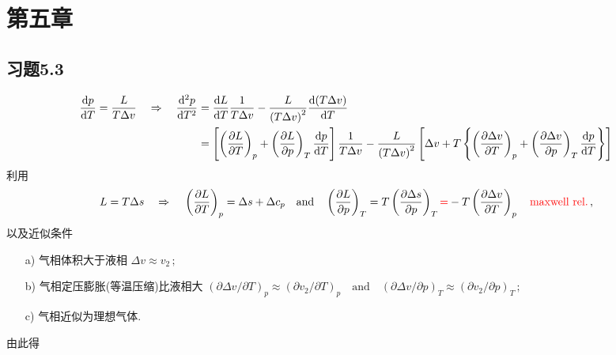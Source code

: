 \documentclass[letterpaper, 10pt]{article}
\begin{document}
\newpage
\section{第五章}

\subsection{习题5.3}
\begin{align*}
\frac{{\rm d} p}{{\rm d} T} = \frac{L}{T\Delta{v}} \quad{} \Rightarrow \quad{} \frac{{\rm d}^{2} p}{{\rm d} T^{2}} & = \frac{{\rm d} L}{{\rm d} T} \frac{1}{T\Delta{v}} - \frac{L}{\left( T \Delta{v} \right)^{2}} \frac{{\rm d}(T\Delta{v})}{{\rm d} T} \nonumber \\
& = \left[ \left( \frac{\partial{L}}{\partial{T}} \right)_{p} + \left( \frac{\partial{L}}{\partial{p}} \right)_{T} \frac{{\rm d} p}{{\rm d} T} \right] \frac{1}{T\Delta{v}} - \frac{L}{\left( T \Delta{v} \right)^{2}} \left[ \Delta{v} + T \left\{ \left( \frac{\partial{\Delta{v}}}{\partial{T}} \right)_{p} + \left( \frac{\partial{\Delta{v}}}{\partial{p}} \right)_{T} \frac{{\rm d} p}{{\rm d} T} \right\} \right]
\end{align*}
利用
\[ L=T\Delta{s} \quad{} \Rightarrow \quad{} \left( \frac{\partial{L}}{\partial{T}} \right)_{p} = \Delta{s} + \Delta{c_{p}} \quad{} \text{and} \quad{} \left( \frac{\partial{L}}{\partial{p}} \right)_{T} = T \left( \frac{\partial{\Delta{s}}}{\partial{p}} \right)_{T} {\color{red}{=}} - T \left( \frac{\partial{\Delta{v}}}{\partial{}T} \right)_{p} \quad{} {\color{red}{\text{maxwell rel.}}}\,, \]
以及近似条件
\begin{itemize}
	\item[a)] 气相体积大于液相 \qquad{} $\Delta{v} \approx v_{2}\,;$
	\item[b)] 气相定压膨胀(等温压缩)比液相大 \qquad{} $(\partial{\Delta{v}}/\partial{T})_{p} \approx (\partial{v_{2}}/\partial{T})_{p} \quad{} \text{and} \quad{} (\partial{\Delta{v}}/\partial{p})_{T} \approx (\partial{v_{2}}/\partial{p})_{T}\,;$
	\item[c)] 气相近似为理想气体.
\end{itemize}
由此得
\end{document}
